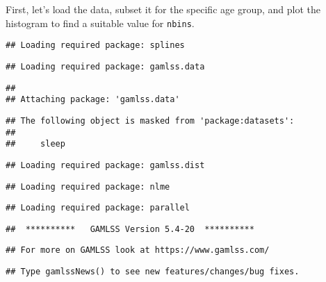 First, let's load the data, subset it for the specific age group, and
plot the histogram to find a suitable value for \texttt{nbins}.

\begin{Shaded}
\begin{Highlighting}[]
\NormalTok{(}\SpecialCharTok{{-}}\NormalTok{) }

\end{Highlighting}
\end{Shaded}

\begin{verbatim}
## Loading required package: splines
\end{verbatim}

\begin{verbatim}
## Loading required package: gamlss.data
\end{verbatim}

\begin{verbatim}
## 
## Attaching package: 'gamlss.data'
\end{verbatim}

\begin{verbatim}
## The following object is masked from 'package:datasets':
## 
##     sleep
\end{verbatim}

\begin{verbatim}
## Loading required package: gamlss.dist
\end{verbatim}

\begin{verbatim}
## Loading required package: nlme
\end{verbatim}

\begin{verbatim}
## Loading required package: parallel
\end{verbatim}

\begin{verbatim}
##  **********   GAMLSS Version 5.4-20  **********
\end{verbatim}

\begin{verbatim}
## For more on GAMLSS look at https://www.gamlss.com/
\end{verbatim}

\begin{verbatim}
## Type gamlssNews() to see new features/changes/bug fixes.
\end{verbatim}

